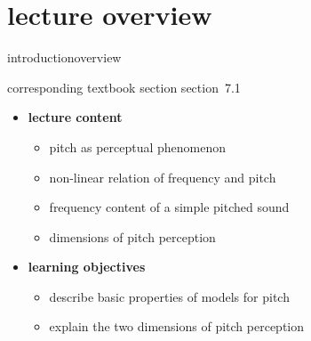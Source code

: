 


\subtitle{Module 7.1: Human Perception of Pitch}


	

    \section[overview]{lecture overview}
        \begin{frame}{introduction}{overview}
            \begin{block}{corresponding textbook section}
                    section~7.1
            \end{block}

            \begin{itemize}
                \item   \textbf{lecture content}
                    \begin{itemize}
                        \item   pitch as perceptual phenomenon 
                        \item   non-linear relation of frequency and pitch
                        \item   frequency content of a simple pitched sound
                        \item   dimensions of pitch perception
                    \end{itemize}
                \bigskip
                \item<2->   \textbf{learning objectives}
                    \begin{itemize}
                        \item   describe basic properties of models for pitch
                        \item   explain the two dimensions of pitch perception
                    \end{itemize}
            \end{itemize}
        \end{frame}

